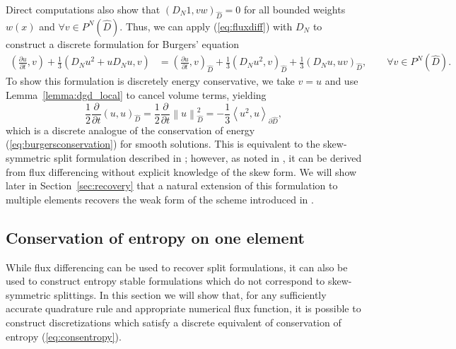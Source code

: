 \documentclass[preprint,10pt]{elsarticle}
\theoremstyle{definition}
\theoremstyle{lemma}
\theoremstyle{theorem}
\theoremstyle{assumption}
\newcommand{\pd}[2]{\frac{\partial#1}{\partial#2}}
\newcommand{\nor}[1]{\left\| #1 \right\|}
\newcommand{\LRp}[1]{\left( #1 \right)}
\newcommand{\LRa}[1]{\left\langle #1 \right\rangle}
\begin{document}
Direct computations also show that $\LRp{D_N 1,vw}_{\widehat{D}} = 0$ for all bounded weights $w(x)$ and $\forall v \in P^N\LRp{\widehat{D}}$.  Thus, we can apply (\ref{eq:fluxdiff}) with $D_N$ to construct a discrete formulation for Burgers' equation
\begin{align}
\LRp{\pd{u}{t},v} + \frac{1}{3}\LRp{D_N u^2 + uD_Nu,v} &= \LRp{\pd{u}{t},v}_{\widehat{D}} + \frac{1}{3}\LRp{D_N u^2,v}_{\widehat{D}} + \frac{1}{3}\LRp{D_Nu,uv}_{\widehat{D}},
\qquad \forall v\in P^N\LRp{\widehat{D}}.
\label{eq:burgersdiscrete}
\end{align}
To show this formulation is discretely energy conservative, we take $v=u$ and use Lemma~\ref{lemma:dgd_local} to cancel volume terms, yielding
\[
\frac{1}{2}\pd{}{t}\LRp{u,u}_{\widehat{D}} = \frac{1}{2}\pd{}{t}\nor{u}^2_{\widehat{D}} = -\frac{1}{3}\LRa{u^2,u}_{\partial \widehat{D}},
\]
which is a discrete analogue of the conservation of energy (\ref{eq:burgersconservation}) for smooth solutions.  This is equivalent to the skew-symmetric split formulation described in \cite{gassner2013skew}; however, as noted in \cite{chen2017entropy}, it can be derived from flux differencing without explicit knowledge of the skew form.  We will show later in Section~\ref{sec:recovery} that a natural extension of this formulation to multiple elements recovers the weak form of the scheme introduced in \cite{ranocha2017extended}.  



\subsection{Conservation of entropy on one element}
\label{sec:ec}
While flux differencing can be used to recover split formulations, it can also be used to construct entropy stable formulations which do not correspond to skew-symmetric splittings.  In this section we will show that, for any sufficiently accurate quadrature rule and appropriate numerical flux function, it is possible to construct discretizations which satisfy a discrete equivalent of conservation of entropy (\ref{eq:consentropy}).  
\end{document}
